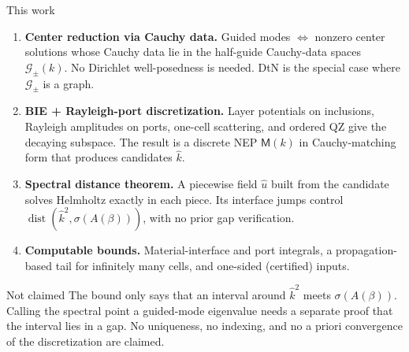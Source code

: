 \documentclass[aspectratio=169]{beamer}
\newcommand{\dist}{\operatorname{dist}}
\begin{document}
\begin{frame}{This work}
  \footnotesize
  \begin{enumerate}
    \item \textbf{Center reduction via Cauchy data.} Guided modes $\Longleftrightarrow$
      nonzero center solutions whose Cauchy data lie in the half-guide Cauchy-data
      spaces $\mathcal G_\pm(k)$. No Dirichlet well-posedness is needed. DtN is
      the special case where $\mathcal G_\pm$ is a graph.
    \item \textbf{BIE + Rayleigh-port discretization.} Layer potentials on
      inclusions, Rayleigh amplitudes on ports, one-cell scattering, and
      ordered QZ give the decaying subspace. The result is a discrete NEP
      $\mathsf M(k)$ in Cauchy-matching form that produces candidates $\widehat k$.
    \item \textbf{Spectral distance theorem.} A piecewise field $\widehat u$ built
      from the candidate solves Helmholtz exactly in each piece. Its interface jumps
      control $\dist(\widehat k^2,\sigma(A(\beta)))$, with no prior gap verification.
    \item \textbf{Computable bounds.} Material-interface and port integrals, a
      propagation-based tail for infinitely many cells, and one-sided
      (certified) inputs.
  \end{enumerate}

  \begin{alertblock}{Not claimed}
    The bound only says that an interval around $\widehat k^2$ meets
    $\sigma(A(\beta))$. Calling the spectral point a guided-mode eigenvalue
    needs a separate proof that the interval lies in a gap. No uniqueness,
    no indexing, and no a priori convergence of the discretization are claimed.
  \end{alertblock}
\end{frame}
\end{document}
